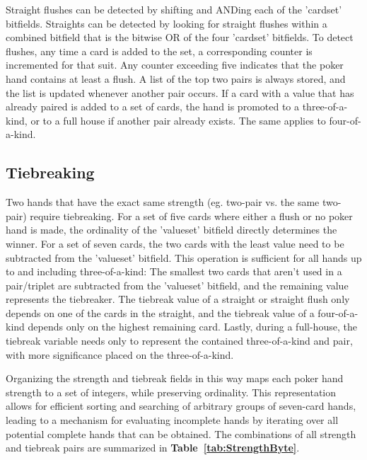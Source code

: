 Straight flushes can be detected by shifting and ANDing each of the 'cardset' bitfields.
Straights can be detected by looking for straight flushes within a combined bitfield that is the bitwise OR of the four 'cardset' bitfields.
To detect flushes, any time a card is added to the set, a corresponding counter is incremented for that suit.
Any counter exceeding five indicates that the poker hand contains at least a flush.
A list of the top two pairs is always stored, and the list is updated whenever another pair occurs.
If a card with a value that has already paired is added to a set of cards, the hand is promoted to a three-of-a-kind, or to a full house if another pair already exists.
The same applies to four-of-a-kind.


\subsection{Tiebreaking}
\label{sec:Tiebreaking}
Two hands that have the exact same strength (eg. two-pair vs. the same two-pair) require tiebreaking.
For a set of five cards where either a flush or no poker hand is made, the ordinality of the 'valueset' bitfield directly determines the winner.
For a set of seven cards, the two cards with the least value need to be subtracted from the 'valueset' bitfield.
This operation is sufficient for all hands up to and including three-of-a-kind: The smallest two cards that aren't used in a pair/triplet are subtracted from the 'valueset' bitfield, and the remaining value represents the tiebreaker.
The tiebreak value of a straight or straight flush only depends on one of the cards in the straight, and the tiebreak value of a four-of-a-kind depends only on the highest remaining card.
Lastly, during a full-house, the tiebreak variable needs only to represent the contained three-of-a-kind and pair, with more significance placed on the three-of-a-kind.

Organizing the strength and tiebreak fields in this way maps each poker hand strength to a set of integers, while preserving ordinality.
This representation allows for efficient sorting and searching of arbitrary groups of seven-card hands, leading to a mechanism for evaluating incomplete hands by iterating over all potential complete hands that can be obtained.
The combinations of all strength and tiebreak pairs are summarized in \textbf{Table~\ref{tab:StrengthByte}}.


